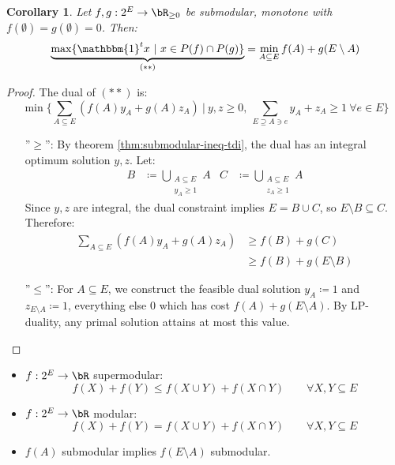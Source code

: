 \documentclass[11pt, a4paper]{article}
\newcommand{\set}[1]{\{#1\}}
\newtheorem{cor}[theorem]{Corollary}
\theoremstyle{remark}
\theoremstyle{definition}
\begin{document}
\begin{cor}\label{cor:submodular-min-max}
	Let $f,g: 2^E\to\bR_{\geq0}$ be submodular, monotone with $f(\emptyset)
		=g(\emptyset)=0$. Then:
	\[\underbrace{\max\set{\mathbbm{1}^tx\ |\ x\in P(f)\cap P(g)}}_{(**)}
		=\min_{A\subseteq E}f(A)+g(E\setminus A)\]
\end{cor}
\begin{proof}
	The dual of $(**)$ is:
	\[\min\set{\sum_{A\subseteq E}(f(A)y_A+g(A)z_A)\ |\
		y,z\geq0,\ \sum_{E\supseteq A\ni e}y_A+z_A\geq1\ \forall e\in E}\]

	\begin{enumerate}
		\item[''$\geq$'':]
		By theorem \ref{thm:submodular-ineq-tdi}, the dual has an integral
		optimum solution $y,z$. Let:
		\begin{align*}
			B & \coloneqq \bigcup_{\substack{A\subseteq E \\ y_A\geq1}}A &
			C & \coloneqq \bigcup_{\substack{A\subseteq E \\ z_A\geq1}}A
		\end{align*}
		Since $y,z$ are integral, the dual constraint implies $E=B\cup C$,
		so $E\setminus B\subseteq C$. Therefore:
		\begin{align*}
			\sum_{A\subseteq E}(f(A)y_A+g(A)z_A) & \geq f(B)+g(C)            \\
			                                     & \geq f(B)+g(E\setminus B)
		\end{align*}

		\item[''$\leq$'':]
		For $A\subseteq E$, we construct the feasible dual solution $y_A\coloneqq 1$
		and $z_{E\setminus A}\coloneqq 1$, everything else 0 which has cost
		$f(A)+g(E\setminus A)$. By LP-duality, any primal solution attains at
		most this value.
	\end{enumerate}
\end{proof}

\begin{itemize}
	\item
	$f: 2^E\to\bR$ supermodular:
	\[f(X)+f(Y)\leq f(X\cup Y)+f(X\cap Y) \qquad \forall X,Y\subseteq E\]

	\item
	$f: 2^E\to\bR$ modular:
	\[f(X)+f(Y)=f(X\cup Y)+f(X\cap Y) \qquad \forall X,Y\subseteq E\]

	\item
	$f(A)$ submodular implies $f(E\setminus A)$ submodular.
\end{itemize}
\end{document}
